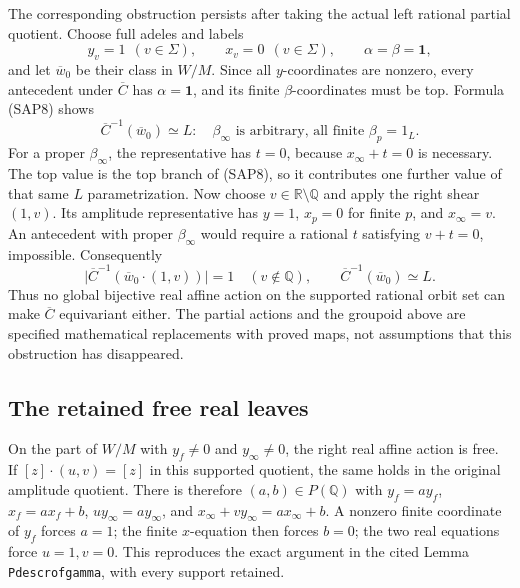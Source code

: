 The corresponding obstruction persists after taking the actual
left rational partial quotient. Choose full adeles and labels
\begin{equation}\tag{SAP21}
y_v=1\ \ (v\in\Sigma),\qquad x_v=0\ \ (v\in\Sigma),
\qquad \alpha=\beta=\boldsymbol1,
\end{equation}
and let $\overline w_0$ be their class in $W/M$.
Since all $y$-coordinates are nonzero, every antecedent under
$\overline C$ has $\alpha=\boldsymbol1$, and its finite
$\beta$-coordinates must be top. Formula (SAP8) shows
\begin{equation}\tag{SAP22}
\overline C^{-1}(\overline w_0)\simeq L:
\quad\beta_\infty\text{ is arbitrary, all finite }\beta_p=1_L.
\end{equation}
For a proper $\beta_\infty$, the representative has $t=0$,
because $x_\infty+t=0$ is necessary. The top value is the
top branch of (SAP8), so it contributes one further value of
that same $L$ parametrization.
Now choose $v\in\mathbb R\setminus\mathbb Q$ and apply the
right shear $(1,v)$. Its amplitude representative has
$y=1$, $x_p=0$ for finite $p$, and $x_\infty=v$.
An antecedent with proper $\beta_\infty$ would require a
rational $t$ satisfying $v+t=0$, impossible. Consequently
\begin{equation}\tag{SAP23}
\bigl|\overline C^{-1}(\overline w_0\cdot(1,v))\bigr|=1
\quad (v\notin\mathbb Q),\qquad
\overline C^{-1}(\overline w_0)\simeq L.
\end{equation}
Thus no global bijective real affine action on the supported
rational orbit set can make $\overline C$ equivariant either.
The partial actions and the groupoid above are specified
mathematical replacements with proved maps, not assumptions
that this obstruction has disappeared.

\subsection{The retained free real leaves}

On the part of $W/M$ with $y_f\ne0$ and $y_\infty\ne0$,
the right real affine action is free. If $[z]\cdot(u,v)=[z]$
in this supported quotient, the same holds in the original
amplitude quotient. There is therefore $(a,b)\in P(\mathbb Q)$
with $y_f=ay_f$, $x_f=ax_f+b$, $u y_\infty=a y_\infty$,
and $x_\infty+v y_\infty=a x_\infty+b$.
A nonzero finite coordinate of $y_f$ forces $a=1$; the finite
$x$-equation then forces $b=0$; the two real equations force
$u=1,v=0$. This reproduces the exact argument in the cited
Lemma \texttt{Pdescrofgamma}, with every support retained.

